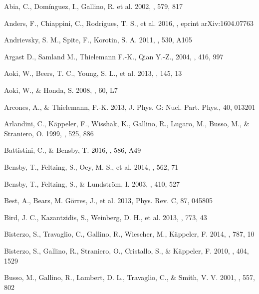 \documentclass[manuscript]{aastex}
\begin{document}
\begin{thebibliography}{}

Abia, C., Dom{\'i}nguez, I., Gallino, R. et al. 2002, \apj, 579, 817 



Anders, F., Chiappini, C., Rodrigues, T. S., et al. 2016, \aap, eprint arXiv:1604.07763

Andrievsky, S. M., Spite, F., Korotin, S. A. 2011, \aap, 530, A105

Argast D., Samland M., Thielemann F.-K., Qian Y.-Z., 2004, \aap, 416,
997

Aoki, W., Beers, T. C., Young, S. L., et al. 2013, \apj, 145, 13

Aoki, W., \& Honda, S. 2008, \pasj, 60, L7

Arcones, A., \& Thielemann, F.-K. 2013, J. Phys. G: Nucl. Part. Phys.,
40, 013201

Arlandini, C., K{\"a}ppeler, F., Wisshak, K., Gallino, R., Lugaro, M.,
Busso, M., \& Straniero, O. 1999, \apj, 525, 886

Battistini, C., \& Bensby, T. 2016, \aap, 586, A49

Bensby, T., Feltzing, S., Oey, M. S., et al. 2014, \aap, 562, 71

Bensby, T., Feltzing, S., \& Lundstr{\"o}m, I. 2003, \aap, 410, 527

Best, A., Bears, M. G{\"o}rres, J., et al. 2013, Phys. Rev. C, 87, 045805

Bird, J. C., Kazantzidis, S., Weinberg, D. H., et al. 2013, \apj, 773, 43

Bisterzo, S., Travaglio, C., Gallino, R., Wiescher, M., K{\"a}ppeler, F. 2014,
\apj, 787, 10

Bisterzo, S., Gallino, R., Straniero, O., Cristallo, S., \& K{\"a}ppeler, F. 2010,
\mnras, 404, 1529 

 Busso, M., 
Gallino, R., Lambert, D. L., Travaglio, C., \& Smith, V. V. 2001, \apj, 557, 802


\end{thebibliography}
\end{document}
